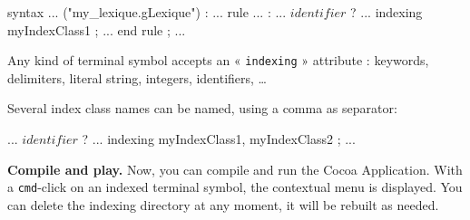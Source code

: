 \begin{galgas}
syntax ... ("my_lexique.gLexique") :
  ...
rule ... :
  ...
  $identifier$ ? ... indexing myIndexClass1 ;
  ...
end rule ;
  ...
\end{galgas}

Any kind of terminal symbol accepts an « \texttt{indexing} » attribute : keywords, delimiters, literal string, integers, identifiers, \dots

Several index class names can be named, using a comma as separator:
\begin{galgas}
  ...
  $identifier$ ? ... indexing myIndexClass1, myIndexClass2 ;
  ...
\end{galgas}






\noindent{} \textbf{Compile and play.} Now, you can compile and run the Cocoa Application. With a \texttt{cmd}-click on an indexed terminal symbol, the contextual menu is displayed. You can delete the indexing directory at any moment, it will be rebuilt as needed.








